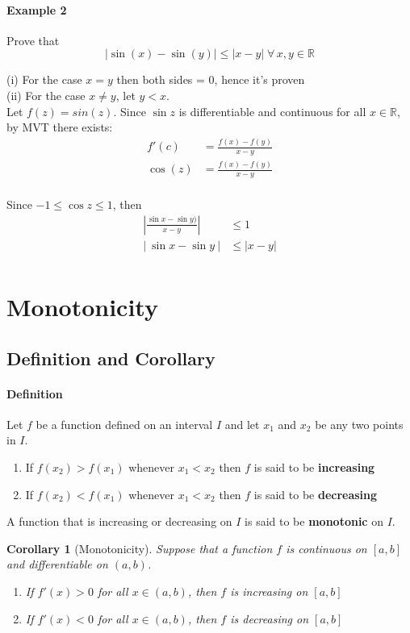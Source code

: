 \documentclass[12pt]{article}
\newtheorem{corollary}{Corollary}
\begin{document}
\paragraph{Example 2} Prove that
\[
    | \sin (x) - \sin (y)| \leq |x - y| \; \forall \, x, y \in \mathbb{R}
\]

(i) For the case $x = y$ then both sides = 0, hence it's proven \\ 
(ii) For the case $x \neq y$, let $y < x$. \\
Let $f(z) = sin(z)$. Since $\sin z$ is differentiable and continuous for all $x \in \mathbb{R}$, by MVT there exists:
\begin{align*} 
    f'(c) &= \frac{f(x) - f(y)}{x - y} \\
    \cos (z) &=  \frac{f(x) - f(y)}{x - y} \\
\end{align*}

Since $-1 \leq \cos z \leq 1$, then
\begin{align*} 
    \left|\frac{\sin x - \sin y)}{x - y} \right| &\leq 1 \\
    \left|\:  \sin x - \sin y\: \right| &\leq |x - y| \\
\end{align*}
    
\section{Monotonicity}
\subsection{Definition and Corollary}
\paragraph{Definition} Let $f$ be a function defined on an interval $I$ and let $x_1$ and $x_2$ be any two points in $I$.
\begin{enumerate} 
     \item If $f(x_2) > f(x_1)$ whenever $x_1 < x_2$ then $f$ is said to be \textbf{increasing}
     \item If $f(x_2) < f(x_1)$ whenever $x_1 < x_2$ then $f$ is said to be \textbf{decreasing}
\end{enumerate}
A function that is increasing or decreasing on $I$ is said to be \textbf{monotonic} on $I$.

\begin{corollary}[Monotonicity]
    Suppose that a function $f$ is continuous on $[a, b]$ and differentiable on $(a,b)$.
    \begin{enumerate} 
        \item If $f'(x) > 0$ for all $x \in (a,b)$, then $f$ is increasing on $[a, b]$
        \item If $f'(x) < 0$ for all $x \in (a,b)$, then $f$ is decreasing on $[a, b]$
   \end{enumerate}
\end{corollary}
\end{document}
